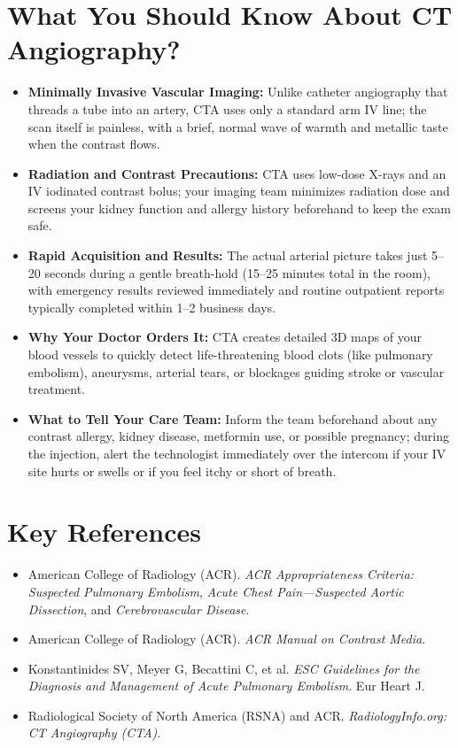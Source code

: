 \section{What You Should Know About CT Angiography?}
\begin{itemize}
    \item \textbf{Minimally Invasive Vascular Imaging:} Unlike catheter angiography that threads a tube into an artery, CTA uses only a standard arm IV line; the scan itself is painless, with a brief, normal wave of warmth and metallic taste when the contrast flows.
    \item \textbf{Radiation and Contrast Precautions:} CTA uses low-dose X-rays and an IV iodinated contrast bolus; your imaging team minimizes radiation dose and screens your kidney function and allergy history beforehand to keep the exam safe.
    \item \textbf{Rapid Acquisition and Results:} The actual arterial picture takes just 5--20 seconds during a gentle breath-hold (15--25 minutes total in the room), with emergency results reviewed immediately and routine outpatient reports typically completed within 1--2 business days.
    \item \textbf{Why Your Doctor Orders It:} CTA creates detailed 3D maps of your blood vessels to quickly detect life-threatening blood clots (like pulmonary embolism), aneurysms, arterial tears, or blockages guiding stroke or vascular treatment.
    \item \textbf{What to Tell Your Care Team:} Inform the team beforehand about any contrast allergy, kidney disease, metformin use, or possible pregnancy; during the injection, alert the technologist immediately over the intercom if your IV site hurts or swells or if you feel itchy or short of breath.
\end{itemize}

\section{Key References}
\begin{itemize}
    \item American College of Radiology (ACR). \textit{ACR Appropriateness Criteria: Suspected Pulmonary Embolism}, \textit{Acute Chest Pain---Suspected Aortic Dissection}, and \textit{Cerebrovascular Disease}.
    \item American College of Radiology (ACR). \textit{ACR Manual on Contrast Media}.
    \item Konstantinides SV, Meyer G, Becattini C, et al. \textit{ESC Guidelines for the Diagnosis and Management of Acute Pulmonary Embolism}. Eur Heart J.
    \item Radiological Society of North America (RSNA) and ACR. \textit{RadiologyInfo.org: CT Angiography (CTA)}.
\end{itemize}
